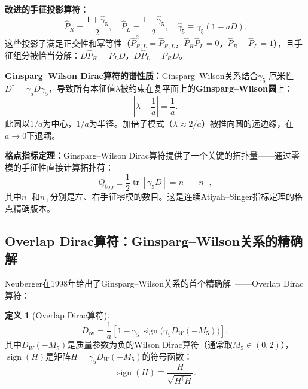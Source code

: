 \documentclass[12pt,a4paper]{ctexart}
\theoremstyle{definition}
\newtheorem{definition}{定义}[section]
\begin{document}
\textbf{改进的手征投影算符：}
\begin{equation}
\hat P_R = \frac{1+\hat\gamma_5}{2}, \quad \hat P_L = \frac{1-\hat\gamma_5}{2}, \quad \hat\gamma_5 \equiv \gamma_5(1 - aD).
\label{eq:GW_projectors}
\end{equation}
这些投影子满足正交性和幂等性（$\hat P_{R,L}^2 = \hat P_{R,L}$，$\hat P_R\hat P_L = 0$，$\hat P_R + \hat P_L = 1$），且手征组分被恰当分解：$D\hat P_R = P_L D$，$D\hat P_L = P_R D$。

\textbf{Ginsparg--Wilson Dirac算符的谱性质：}Ginsparg--Wilson关系结合$\gamma_5$-厄米性$D^\dagger = \gamma_5 D\gamma_5$，导致所有本征值$\lambda$被约束在复平面上的\textbf{Ginsparg--Wilson圆}上：
\begin{equation}
\left|\lambda - \frac{1}{a}\right| = \frac{1}{a}.
\label{eq:GW_circle}
\end{equation}
此圆以$1/a$为中心，$1/a$为半径。加倍子模式（$\lambda \approx 2/a$）被推向圆的远边缘，在$a\to 0$下退耦。

\textbf{格点指标定理：}Ginsparg--Wilson Dirac算符提供了一个关键的拓扑量——通过零模的手征性直接计算拓扑荷：
\begin{equation}
Q_{\text{top}} \equiv \frac{1}{2}\operatorname{tr}[\gamma_5 D] = n_- - n_+,
\label{eq:index_theorem}
\end{equation}
其中$n_-$和$n_+$分别是左、右手征零模的数目。这是连续Atiyah--Singer指标定理的格点精确版本。

\subsection{Overlap Dirac算符：Ginsparg--Wilson关系的精确解}

Neuberger在1998年给出了Ginsparg--Wilson关系的首个精确解~\cite{Neuberger1998overlap}——Overlap Dirac算符：

\begin{definition}[Overlap Dirac算符]
\begin{equation}
\boxed{D_{\text{ov}} = \frac{1}{a}\left[1 - \gamma_5\,\operatorname{sign}\!\big(\gamma_5 D_W(-M_5)\big)\right]},
\label{eq:overlap}
\end{equation}
其中$D_W(-M_5)$是质量参数为负的Wilson Dirac算符（通常取$M_5 \in (0,2)$），$\operatorname{sign}(H)$是矩阵$H = \gamma_5 D_W(-M_5)$的符号函数：
\begin{equation}
\operatorname{sign}(H) \equiv \frac{H}{\sqrt{H^\dagger H}}.
\label{eq:sign_function}
\end{equation}
\end{definition}
\end{document}
